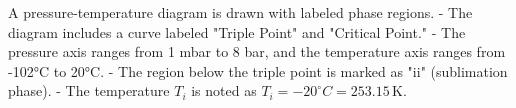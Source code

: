 A pressure-temperature diagram is drawn with labeled phase regions.  
- The diagram includes a curve labeled "Triple Point" and "Critical Point."  
- The pressure axis ranges from 1 mbar to 8 bar, and the temperature axis ranges from -102°C to 20°C.  
- The region below the triple point is marked as "ii" (sublimation phase).  
- The temperature \( T_i \) is noted as \( T_i = -20^\circ C = 253.15 \, \text{K} \).
